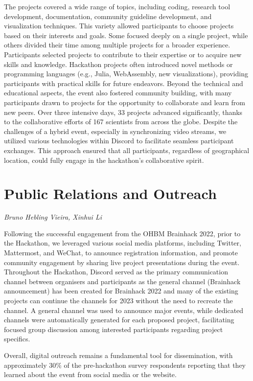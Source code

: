 \documentclass{article}
\newcommand\coordinator[1]{\begin{flushleft}\small\textit{#1}\end{flushleft}}
\begin{document}
The projects covered a wide range of topics, including coding, research tool development, documentation, community guideline development, and visualization techniques.
This variety allowed participants to choose projects based on their interests and goals.
Some focused deeply on a single project, while others divided their time among multiple projects for a broader experience.
Participants selected projects to contribute to their expertise or to acquire new skills and knowledge.
Hackathon projects often introduced novel methods or programming languages (e.g., Julia, WebAssembly, new visualizations), providing participants with practical skills for future endeavors.
Beyond the technical and educational aspects, the event also fostered community building, with many participants drawn to projects for the opportunity to collaborate and learn from new peers.
Over three intensive days, 33 projects advanced significantly, thanks to the collaborative efforts of 167 scientists from across the globe.
Despite the challenges of a hybrid event, especially in synchronizing video streams, we utilized various technologies within Discord to facilitate seamless participant exchanges.
This approach ensured that all participants, regardless of geographical location, could fully engage in the hackathon's collaborative spirit.

\section{Public Relations and Outreach}
\coordinator{Bruno Hebling Vieira, Xinhui Li}

Following the successful engagement from the OHBM Brainhack 2022, prior to the Hackathon, we leveraged various social media platforms, including Twitter, Mattermost, and WeChat, to announce registration information, and promote community engagement by sharing live project presentations during the event.
Throughout the Hackathon, Discord served as the primary communication channel between organisers and participants as the general channel (Brainhack announcement) has been created for Brainhack 2022 and many of the existing projects can continue the channels for 2023 without the need to recreate the channel.
A general channel was used to announce major events, while dedicated channels were automatically generated for each proposed project, facilitating focused group discussion among interested participants regarding project specifics.

Overall, digital outreach remains a fundamental tool for dissemination, with approximately 30\% of the pre-hackathon survey respondents reporting that they learned about the event from social media or the website.
\end{document}
